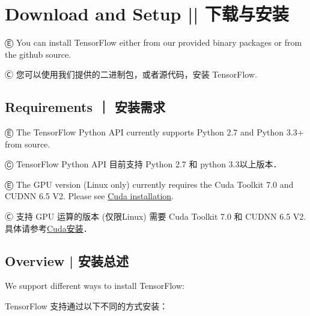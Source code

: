 


\section {Download and Setup   ||   下载与安装} \label{download_install}

Ⓔ \textcolor{etc}{You can install TensorFlow either from our provided binary packages or from the github source.}

Ⓒ 您可以使用我们提供的二进制包，或者源代码，安装 TensorFlow.

%
\subsection {Requirements  ｜  安装需求}

Ⓔ \textcolor{etc}{The TensorFlow Python API currently supports Python 2.7 and Python 3.3+ from source.}

Ⓒ TensorFlow Python API 目前支持 Python 2.7 和 python 3.3以上版本．

Ⓔ \textcolor{etc}{The GPU version (Linux only) currently requires the Cuda Toolkit 7.0 and CUDNN 6.5 V2. Please see \hyperref[install_cuda]{Cuda installation}.}

Ⓒ 支持 GPU 运算的版本 (仅限Linux) 需要 Cuda Toolkit 7.0 和 CUDNN 6.5 V2. 具体请参考\hyperref[install_cuda]{Cuda安装}．

%
\subsection {Overview  |  安装总述}

We support different ways to install TensorFlow:

TensorFlow 支持通过以下不同的方式安装：

